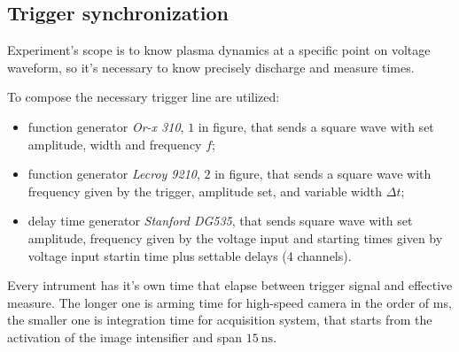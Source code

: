 \subsection{Trigger synchronization}
Experiment's scope is to know plasma dynamics at a specific point on voltage waveform, so it's necessary to know precisely discharge and measure times.

To compose the necessary trigger line are utilized:
\begin{itemize}
 \item function generator \emph{Or-x 310}, $1$ in figure, that sends a square wave with set amplitude, width and frequency $f$;
 \item function generator \emph{Lecroy 9210}, $2$ in figure, that sends a square wave with frequency given by the trigger, amplitude set, and variable width $\Delta t$;
 \item delay time generator \emph{Stanford DG535}, that sends square wave with set amplitude, frequency given by the voltage input and starting times given by voltage input startin time plus settable delays (4 channels).
\end{itemize}

Every intrument has it's own time that elapse between trigger signal and effective measure. The longer one is arming time for high-speed camera in the order of \si{\milli\second}, the smaller one is integration time for acquisition system, that starts from the activation of the image intensifier and span $\SI{15}{\nano\second}$.

